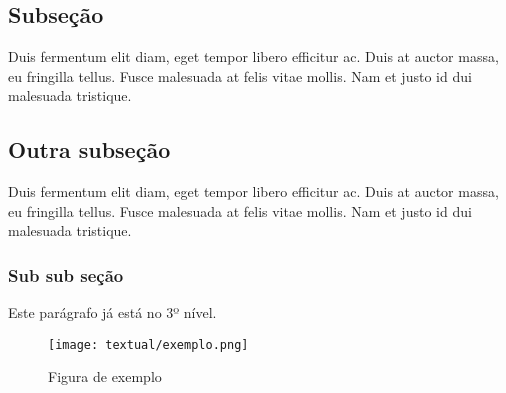 \subsection{Subseção}
Duis fermentum elit diam, eget tempor libero efficitur ac. Duis at auctor massa, eu fringilla tellus. Fusce malesuada at felis vitae mollis. Nam et justo id dui malesuada tristique.

\subsection{Outra subseção}
Duis fermentum elit diam, eget tempor libero efficitur ac. Duis at auctor massa, eu fringilla tellus. Fusce malesuada at felis vitae mollis. Nam et justo id dui malesuada tristique.

\begin{table}[ht]
	\centering
\end{table}

\subsubsection{Sub sub seção}
Este parágrafo já está no 3º nível.

\begin{figure}[htb]
	\caption{\label{exemplo}Figura de exemplo}
	\begin{center}
	\texttt{[image: textual/exemplo.png]}
	\end{center}
\end{figure}
